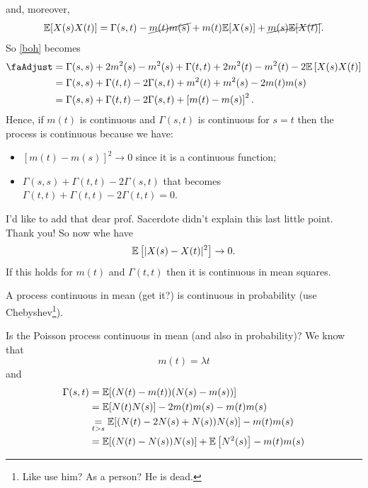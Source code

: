 \documentclass[12pt]{report}
\begin{document}
\begin{enumerate}
\begin{fancyproof}
\begin{equation*}
			\end{equation*}
			and, moreover,
			\begin{equation*}
				\mathbb{E}[X(s)X(t)]=\Gamma(s,t)-\cancel{m(t)m(s)}+m(t)\mathbb{E}[X(s)]+\cancel{m(s)\mathbb{E}[X(t)]}.
			\end{equation*}
			So \ref{boh} becomes
			\begin{align*}
				\text{\faAdjust}&=\Gamma(s,s)+2m^{2}(s)-m^{2}(s)+\Gamma(t,t)+2m^{2}(t)-m^{2}(t)-2\evs\left[X(s)X(t)\right]\\
				&=\Gamma(s,s)+\Gamma(t,t)-2\Gamma(s,t)+m^{2}(t)+m^{2}(s)-2m(t)m(s)\\
				&=\Gamma(s,s)+\Gamma(t,t)-2\Gamma(s,t)+\left[m(t)-m(s)\right]^{2}.
			\end{align*}
			Hence, if $m(t)$ is continuous and $\Gamma(s,t)$ is continuous for $s=t$ then the process is continuous because we have:
			\begin{itemize}
				\item $[m(t)-m(s)]^{2}\to0$ since it is a continuous function;
				\item $\Gamma(s,s)+\Gamma(t,t)-2\Gamma(s,t)$ that becomes $\Gamma(t,t)+\Gamma(t,t)-2\Gamma(t,t)=0$.
			\end{itemize}
			I'd like to add that dear prof. Sacerdote didn't explain this last little point. Thank you! So now whe have
			\begin{equation*}
				\mathbb{E}\left[|X(s)-X(t)|^{2}\right]\to0.
			\end{equation*}
			If this holds for $m(t)$ and $\Gamma(t,t)$ then it is continuous in mean squares.
		\end{fancyproof}
		\begin{remark}
			A process continuous in mean \faSquare[regular] (get it?) is continuous in probability (use Chebyshev\footnote{Like use him? As a person? He is dead.}).
		\end{remark}
		Is the Poisson process continuous in mean \faSquare[regular] (and also in probability)? We know that
		\begin{equation*}
			m(t)=\lambda t
		\end{equation*}
		and 
		\begin{align*}
			\Gamma(s,t)&=\evs[(N(t)-m(t))(N(s)-m(s))]\\
			&=\evs[N(t)N(s)]-2m(t)m(s)-m(t)m(s)\\
			&\underset{t>s}{=}\evs[(N(t)-2N(s)+N(s))N(s)]-m(t)m(s)\\
			&=\evs[(N(t)-N(s))N(s)]+\evs\left[N^{2}(s)\right]-m(t)m(s)\\

\end{align*}
\end{enumerate}
\end{document}
